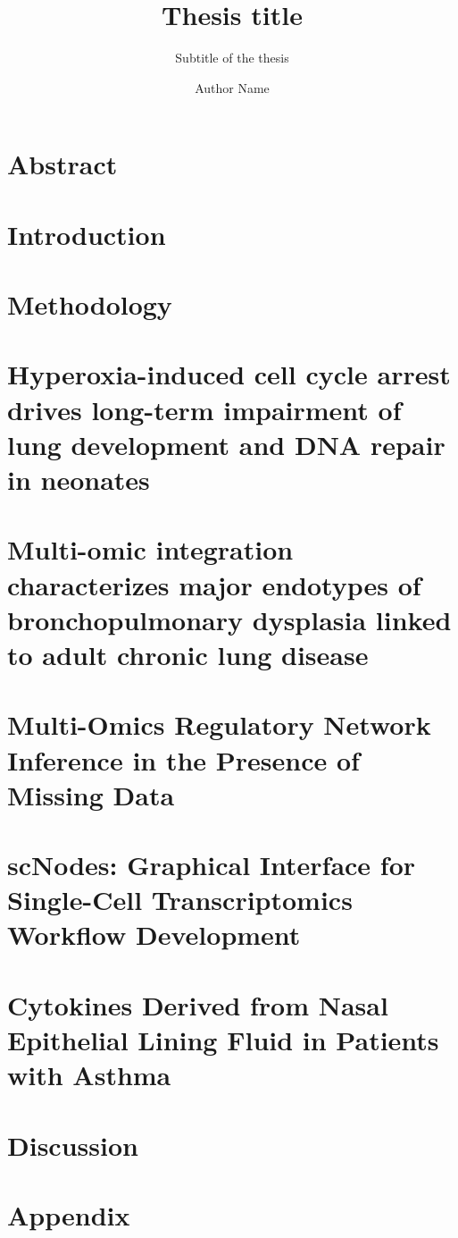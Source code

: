 \documentclass[
  a4paper,            %
  thesis=phd,         %
  english,            %
]{tum/tumbook}
\title{Thesis title}
\subtitle{Subtitle of the thesis}
\author{Author Name}
\begin{document}
\frontmatter
\maketitle
\chapter{Abstract}

\tableofcontents

\mainmatter
\chapter{Introduction}


\chapter{Methodology}


\chapter{Hyperoxia-induced cell cycle arrest drives long-term impairment of lung development and DNA repair in neonates}


\chapter{Multi-omic integration characterizes major endotypes of bronchopulmonary dysplasia linked to adult chronic lung disease}


\chapter{Multi-Omics Regulatory Network Inference in the Presence of Missing Data}


\chapter{scNodes: Graphical Interface for Single-Cell Transcriptomics Workflow Development}


\chapter{Cytokines Derived from Nasal Epithelial Lining Fluid in Patients with Asthma}


\chapter{Discussion}


\appendix
\chapter{Appendix}
\lipsum[4]

% 
\end{document}
